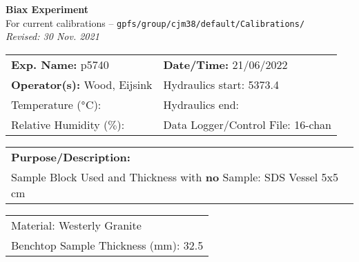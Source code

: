 \documentclass[letterpaper, 10pt]{article}
\begin{document}
\begin{center}
    {\Large \textbf{Biax Experiment}}\\
    {\small For current calibrations -- \texttt{gpfs/group/cjm38/default/Calibrations/}}\\
    {\footnotesize \textit{Revised: 30 Nov. 2021}}
\end{center}



\begin{table}[!ht]
	\renewcommand{\arraystretch}{1.1}
	\begin{tabular}{p{10cm} p{10cm} }
	    \textbf{Exp. Name: }p5740 & \textbf{Date/Time: }21/06/2022\\
	    \textbf{Operator(s): }Wood, Eijsink & Hydraulics start: 5373.4 \\
	    Temperature ($\degree$C):  & Hydraulics end:  \\
	    Relative Humidity ($\%$):  & Data Logger/Control File: 16-chan \\
	\end{tabular}
\end{table} 
\vspace{-0.5cm} 

\begin{table}[!ht]
	\renewcommand{\arraystretch}{1.1}
	\begin{tabular}{p{20cm}}\textbf{Purpose/Description:}  \\Sample Block Used and Thickness with \textbf{no} Sample: SDS Vessel 5x5 cm \\
	\end{tabular}
    \end{table} \vspace{-0.5cm} 

\begin{table}[!ht]
        \small
        \renewcommand{\arraystretch}{1.2}
        \begin{tabular}{ |p{7cm}| } \hline 
Material: Westerly Granite \\Benchtop Sample Thickness (mm): 32.5 \\ \hline \end{tabular} \end{table} \vspace{-0.5cm} 
\end{document}
